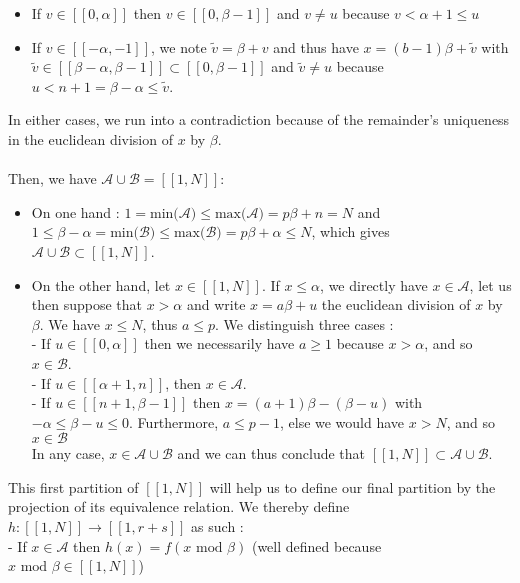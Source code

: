 \documentclass{article}
\newtheorem{computational theorem}{Computational Theorem}[theorem]
\begin{document}
\begin{itemize}
\item If $v \in [\![0,\alpha]\!]$ then $v \in [\![0,\beta - 1]\!]$ and $v \neq u$ because $v < \alpha + 1 \leqslant u$
\item If $v \in [\![-\alpha,-1]\!]$, we note $\tilde{v} = \beta + v$ and thus have $x = (b-1)\beta + \tilde{v}$ with $\tilde{v} \in [\![\beta - \alpha,\beta - 1]\!] \subset [\![0,\beta - 1]\!]$ and $\tilde{v} \neq u$ because $u < n+1 = \beta - \alpha \leqslant \tilde{v}$.
\end{itemize}
In either cases, we run into a contradiction because of the remainder's uniqueness in the euclidean division of $x$ by $\beta$.\\
\\
Then, we have \underline{$\mathcal{A} \cup \mathcal{B} = [\![1,N]\!]$}:
\begin{itemize}
\item On one hand : $1 = \text{min($\mathcal{A}$)} \leqslant \text{max($\mathcal{A}$)} = p\beta + n = N$ and $1 \leqslant \beta - \alpha = \text{min($\mathcal{B}$)} \leqslant \text{max($\mathcal{B}$)} = p\beta + \alpha \leqslant N$, which gives $\mathcal{A} \cup \mathcal{B} \subset [\![1,N]\!]$.
\item On the other hand, let $x \in  [\![1,N]\!]$. If $x \leqslant \alpha$, we directly have $x \in \mathcal{A}$, let us then suppose that $x > \alpha$ and write $x = a\beta + u$ the euclidean division of $x$ by $\beta$. We have $x \leqslant N$, thus $a \leqslant p$. We distinguish three cases : \\
- If $u \in [\![0,\alpha]\!]$ then we necessarily have $a \geqslant 1$ because $x > \alpha$, and so $x \in \mathcal{B}$.\\
- If $u \in [\![\alpha + 1,n]\!]$, then $x \in \mathcal{A}$. \\
- If $u \in [\![n + 1,\beta - 1]\!]$ then $x = (a+1)\beta - (\beta - u)$ with $-\alpha \leqslant \beta - u \leqslant 0$. Furthermore, $a \leqslant p - 1$, else we would have $x > N$, and so $x \in \mathcal{B}$ \\
In any case, $x \in \mathcal{A} \cup \mathcal{B}$ and we can thus conclude that $[\![1,N]\!] \subset \mathcal{A} \cup \mathcal{B}$.
\end{itemize}
This first partition of $[\![1,N]\!]$ will help us to define our final partition by the projection of its equivalence relation. We thereby define $h : [\![1,N]\!] \longrightarrow [\![1,r+s]\!]$ as such :\\
- If $x \in \mathcal{A}$ then $h(x) = f(x \text{ mod } \beta)$ (well defined because $x \text{ mod } \beta \in [\![1,N]\!]$)\\
\end{document}

